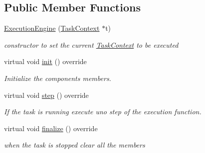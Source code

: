 \subsection*{Public Member Functions}
\begin{DoxyCompactItemize}
\item 
\hypertarget{classcoco_1_1_execution_engine_aa0a33c45c90946986237b0ccc82338ce}{\hyperlink{classcoco_1_1_execution_engine_aa0a33c45c90946986237b0ccc82338ce}{Execution\-Engine} (\hyperlink{classcoco_1_1_task_context}{Task\-Context} $\ast$t)}\label{classcoco_1_1_execution_engine_aa0a33c45c90946986237b0ccc82338ce}

\begin{DoxyCompactList}\small\item\em constructor to set the current \hyperlink{classcoco_1_1_task_context}{Task\-Context} to be executed \end{DoxyCompactList}\item 
\hypertarget{classcoco_1_1_execution_engine_a99ee8574a588ae8fa647bbca9f314fbd}{virtual void \hyperlink{classcoco_1_1_execution_engine_a99ee8574a588ae8fa647bbca9f314fbd}{init} () override}\label{classcoco_1_1_execution_engine_a99ee8574a588ae8fa647bbca9f314fbd}

\begin{DoxyCompactList}\small\item\em Initialize the components members. \end{DoxyCompactList}\item 
\hypertarget{classcoco_1_1_execution_engine_a9c3cfba8051944ac90a12bae7baf99c3}{virtual void \hyperlink{classcoco_1_1_execution_engine_a9c3cfba8051944ac90a12bae7baf99c3}{step} () override}\label{classcoco_1_1_execution_engine_a9c3cfba8051944ac90a12bae7baf99c3}

\begin{DoxyCompactList}\small\item\em If the task is running execute uno step of the execution function. \end{DoxyCompactList}\item 
\hypertarget{classcoco_1_1_execution_engine_a5375d0bb4a83c1c4142ea9907220c4c7}{virtual void \hyperlink{classcoco_1_1_execution_engine_a5375d0bb4a83c1c4142ea9907220c4c7}{finalize} () override}\label{classcoco_1_1_execution_engine_a5375d0bb4a83c1c4142ea9907220c4c7}

\begin{DoxyCompactList}\small\item\em when the task is stopped clear all the members \end{DoxyCompactList}\end{DoxyCompactItemize}
